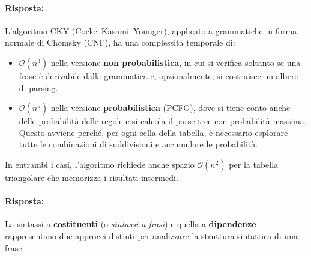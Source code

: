 

\paragraph{Risposta:}
L'algoritmo CKY (Cocke–Kasami–Younger), applicato a grammatiche in forma normale di Chomsky (CNF), ha una complessità temporale di:

\begin{itemize}
    \item $\mathcal{O}(n^3)$ nella versione \textbf{non probabilistica}, in cui si verifica soltanto se una frase è derivabile dalla grammatica e, opzionalmente, si costruisce un albero di parsing.
    \item $\mathcal{O}(n^5)$ nella versione \textbf{probabilistica} (PCFG), dove si tiene conto anche delle probabilità delle regole e si calcola il parse tree con probabilità massima. Questo avviene perché, per ogni cella della tabella, è necessario esplorare tutte le combinazioni di suddivisioni e accumulare le probabilità.
\end{itemize}

\medskip
\noindent
In entrambi i casi, l'algoritmo richiede anche spazio $\mathcal{O}(n^2)$ per la tabella triangolare che memorizza i risultati intermedi.



\paragraph{Risposta:}  
La sintassi a \textbf{costituenti} (o \textit{sintassi a frasi}) e quella a \textbf{dipendenze} rappresentano due approcci distinti per analizzare la struttura sintattica di una frase.

